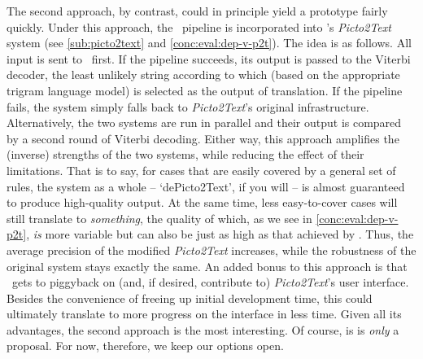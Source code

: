 The second approach, by contrast, could in principle yield a prototype fairly
quickly. Under this approach, the \depicto\ pipeline is incorporated into
\citet{sevens2015natural}'s \emph{Picto2Text} system (see \cref{sub:picto2text}
and \cref{conc:eval:dep-v-p2t}). The idea is as follows. All input is sent to
\depicto\ first. If the pipeline succeeds, its output is passed to the Viterbi
decoder, the least unlikely string according to which (based on the appropriate
trigram language model) is selected as the output of translation. If the
pipeline fails, the system simply falls back to \emph{Picto2Text}'s original
infrastructure. Alternatively, the two systems are run in parallel and their
output is compared by a second round of Viterbi decoding. Either way, this
approach amplifies the (inverse) strengths of the two systems, while reducing
the effect of their limitations. That is to say, for cases that are easily
covered by a general set of rules, the system as a whole -- `dePicto2Text', if
you will -- is almost guaranteed to produce high-quality output. At the same
time, less easy-to-cover cases will still translate to \emph{something}, the
quality of which, as we see in \cref{conc:eval:dep-v-p2t}, \emph{is} more
variable but can also be just as high as that achieved by \depicto. Thus, the
average precision of the modified \emph{Picto2Text} increases, while the
robustness of the original system stays exactly the same. An added bonus to
this approach is that \depicto\ gets to piggyback on (and, if desired,
contribute to) \emph{Picto2Text}'s user interface. Besides the convenience of
freeing up initial development time, this could ultimately translate to more
progress on the interface in less time. Given all its advantages, the second
approach is the most interesting. Of course, is is \emph{only} a proposal. For
now, therefore, we keep our options open.
